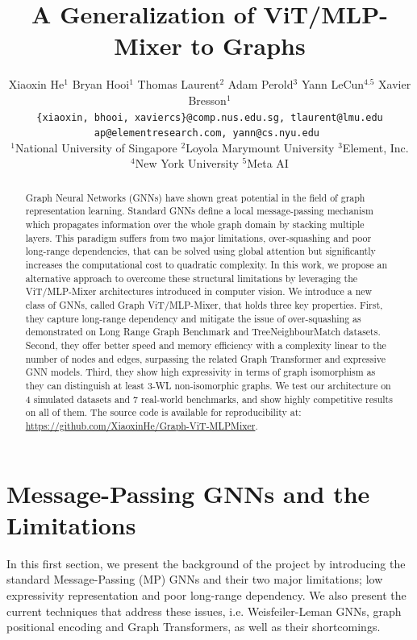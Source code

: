 \documentclass{article}
\title{A Generalization of ViT/MLP-Mixer to Graphs}
\author{%
  Xiaoxin He$^{1}$ 
  \hspace{0.18cm}
  Bryan Hooi$^1$
  \hspace{0.18cm}
  Thomas Laurent$^2$ 
  \hspace{0.18cm}
  Adam Perold$^{3}$ 
  \hspace{0.18cm}
  Yann LeCun$^{4.5}$ 
  \hspace{0.18cm}
  Xavier Bresson$^1$ \vspace{0.15cm} \\
  \texttt{\{xiaoxin, bhooi, xaviercs\}@comp.nus.edu.sg, tlaurent@lmu.edu} \\ \texttt{ap@elementresearch.com, yann@cs.nyu.edu } \vspace{0.15cm} \\
  {\normalfont $^1$National University of Singapore \hspace{0.18cm} $^2$Loyola Marymount University \hspace{0.18cm} $^3$Element, Inc.}\\
  $^4$New York University \hspace{0.18cm} $^5$Meta AI \hspace{0.14cm}
}
\begin{document}
\maketitle

\begin{abstract}
Graph Neural Networks (GNNs) have shown great potential in the field of graph representation learning. Standard GNNs define a local message-passing mechanism which propagates information over the whole graph domain by stacking multiple layers. This paradigm suffers from two major limitations, over-squashing and poor long-range dependencies, that can be solved using global attention but significantly increases the computational cost to quadratic complexity. 
In this work, we propose an alternative approach to overcome these structural limitations by leveraging the ViT/MLP-Mixer architectures introduced in computer vision.
We introduce a new class of GNNs, called Graph ViT/MLP-Mixer, that holds three key properties. First, they capture long-range dependency and mitigate the issue of over-squashing as demonstrated on Long Range Graph Benchmark and TreeNeighbourMatch datasets. Second, they offer better speed and memory efficiency with a complexity linear to the number of nodes and edges, surpassing the related Graph Transformer and expressive GNN models. Third, they show high expressivity in terms of graph isomorphism as they can distinguish at least 3-WL non-isomorphic graphs. 
We test our architecture on 4 simulated datasets and 7 real-world benchmarks, and show highly competitive results on all of them. 
The source code is available for reproducibility at: \url{https://github.com/XiaoxinHe/Graph-ViT-MLPMixer}.
\end{abstract}


\section{Message-Passing GNNs and the Limitations}\label{sec: intro}

In this first section, we present the background of the project by introducing the standard Message-Passing (MP) GNNs and their two major limitations; low expressivity representation and poor long-range dependency. We also present the current techniques that address these issues, i.e. Weisfeiler-Leman GNNs, graph positional encoding and Graph Transformers, as well as their shortcomings.
\end{document}
